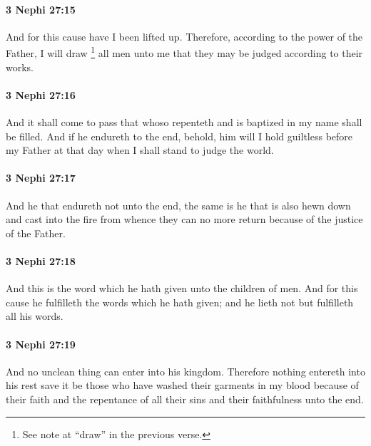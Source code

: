 		\paragraph{3 Nephi 27:15} %
			\label{3NEPHI-27-15}

			And for this cause have I been lifted up.
			Therefore, according to the power of the Father,
			I will draw%
				\footnote{%
					See note at ``draw'' in the previous verse.
					}
			all men unto me
			that they may be judged according to their works.

		\paragraph{3 Nephi 27:16} %
			\label{3NEPHI-27-16}

			And it shall come to pass that whoso repenteth
			and is baptized in my name shall be filled.
			And if he endureth to the end,
			behold, him will I hold guiltless before my Father
			at that day when I shall stand to judge the world.

		\paragraph{3 Nephi 27:17} %
			\label{3NEPHI-27-17}

			And he that endureth not unto the end,
			the same is he that is also hewn down and cast into the fire
			from whence they can no more return
			because of the justice of the Father.

		\paragraph{3 Nephi 27:18} %
			\label{3NEPHI-27-18}

			And this is the word which he hath given unto the children of men.
			And for this cause he fulfilleth the words which he hath given;
			and he lieth not but fulfilleth all his words.

		\paragraph{3 Nephi 27:19} %
			\label{3NEPHI-27-19}

			And no unclean thing can enter into his kingdom.
			Therefore nothing entereth into his rest
			save it be those who have washed their garments in my blood
			because of their faith and the repentance of all their sins
			and their faithfulness unto the end.

